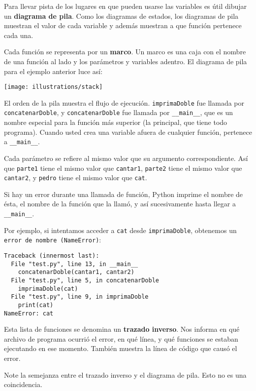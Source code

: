 \label{stackdiagram}  

Para llevar pista de los lugares en que pueden usarse las variables
es útil dibujar un \textbf{diagrama de pila}. Como los diagramas de
estados, los diagramas de pila muestran el valor de cada variable
y además muestran a que función pertenece cada una.

Cada función se representa por un \textbf{marco}. Un marco es una
caja con el nombre de una función al lado y los parámetros y variables
adentro. El diagrama de pila para el ejemplo anterior luce así:

 \beforefig \centerline{\texttt{[image: illustrations/stack]}}
\afterfig

El orden de la pila muestra el flujo de ejecución. \texttt{imprimaDoble}
fue llamada por \texttt{concatenarDoble}, y \texttt{concatenarDoble}
fue llamada por \texttt{\_\_main\_\_}, que es un nombre especial para
la función más superior (la principal, que tiene todo programa). Cuando
usted crea una variable afuera de cualquier función, pertenece a \texttt{\_\_main\_\_}.

Cada parámetro se refiere al mismo valor que su argumento correspondiente.
Así que \texttt{parte1} tiene el mismo valor que \texttt{cantar1},
\texttt{parte2} tiene el mismo valor que \texttt{cantar2}, y \texttt{pedro}
tiene el mismo valor que \texttt{cat}.

Si hay un error durante una llamada de función, Python imprime el
nombre de ésta, el nombre de la función que la llamó, y así sucesivamente
hasta llegar a \texttt{\_\_main\_\_}.

Por ejemplo, si intentamos acceder a \texttt{cat} desde \texttt{imprimaDoble},
obtenemos un \texttt{error de nombre (NameError)}:
\begin{verbatim}
Traceback (innermost last):
  File "test.py", line 13, in __main__
    concatenarDoble(cantar1, cantar2)
  File "test.py", line 5, in concatenarDoble
    imprimaDoble(cat)
  File "test.py", line 9, in imprimaDoble
    print(cat)
NameError: cat
\end{verbatim}
Esta lista de funciones se denomina un \textbf{trazado inverso}. Nos
informa en qué archivo de programa ocurrió el error, en qué línea,
y qué funciones se estaban ejecutando en ese momento. También muestra
la línea de código que causó el error.


Note la semejanza entre el trazado inverso y el diagrama de pila.
Esto no es una coincidencia.

